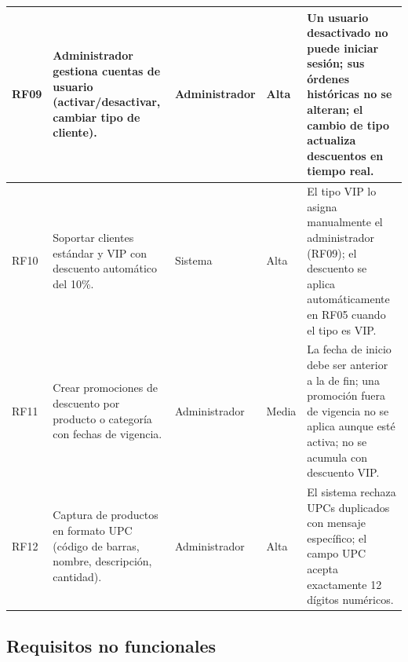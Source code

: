 \documentclass[12pt,a4paper]{article}
\begin{document}
\begin{longtable}{|l|p{5.5cm}|p{3cm}|p{1.5cm}|p{4cm}|}
    RF09        & Administrador gestiona cuentas de usuario (activar/desactivar, cambiar tipo de cliente).   & Administrador            & Alta            &
    Un usuario desactivado no puede iniciar sesión; sus órdenes históricas no se alteran; el cambio de tipo actualiza descuentos en tiempo real.                                            \\ \hline

    RF10        & Soportar clientes estándar y VIP con descuento automático del 10\%.                        & Sistema                  & Alta            &
    El tipo VIP lo asigna manualmente el administrador (RF09); el descuento se aplica automáticamente en RF05 cuando el tipo es VIP.                                                        \\ \hline

    RF11        & Crear promociones de descuento por producto o categoría con fechas de vigencia.            & Administrador            & Media           &
    La fecha de inicio debe ser anterior a la de fin; una promoción fuera de vigencia no se aplica aunque esté activa; no se acumula con descuento VIP.                                     \\ \hline

    RF12        & Captura de productos en formato UPC (código de barras, nombre, descripción, cantidad).     & Administrador            & Alta            &
    El sistema rechaza UPCs duplicados con mensaje específico; el campo UPC acepta exactamente 12 dígitos numéricos.                                                                        \\ \hline
\end{longtable}


\subsection{Requisitos no funcionales}
\end{document}
